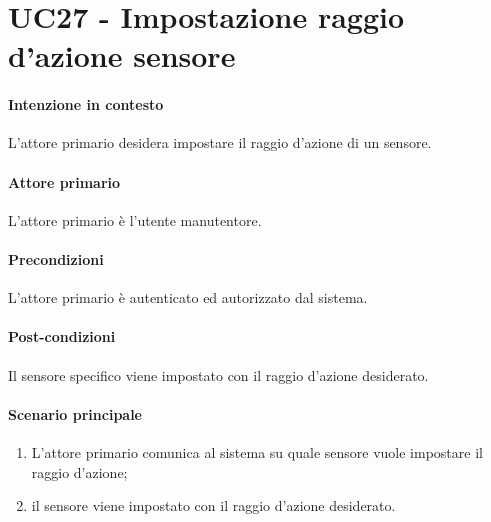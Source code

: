 \section{UC27 - Impostazione raggio d'azione sensore}\label{uc:27}
\paragraph{Intenzione in contesto} L'attore primario desidera impostare il raggio d'azione di un sensore.
\paragraph{Attore primario} L'attore primario è l'utente manutentore.
\paragraph{Precondizioni} L'attore primario è autenticato ed autorizzato dal sistema.
\paragraph{Post-condizioni} Il sensore specifico viene impostato con il raggio d'azione desiderato.
\paragraph{Scenario principale}
\begin{enumerate}
    \item L'attore primario comunica al sistema su quale sensore vuole impostare il raggio d'azione;
    \item il sensore viene impostato con il raggio d'azione desiderato.
\end{enumerate}
